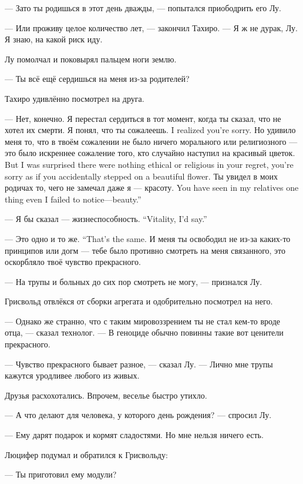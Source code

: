 --- Зато ты родишься в этот день дважды, --- попытался приободрить его Лу.

--- Или проживу целое количество лет, --- закончил Тахиро.
--- Я ж не дурак, Лу.
Я знаю, на какой риск иду.

Лу помолчал и поковырял пальцем ноги землю.

--- Ты всё ещё сердишься на меня из-за родителей?

Тахиро удивлённо посмотрел на друга.

--- Нет, конечно.
Я перестал сердиться в тот момент, когда ты сказал, что не хотел их смерти.
{Я понял, что ты сожалеешь.}
{I realized you're sorry.}
{Но удивило меня то, что в твоём сожалении не было ничего морального или религиозного --- это было искреннее сожаление того, кто случайно наступил на красивый цветок.}
{But I was surprised there were nothing ethical or religious in your regret, you're sorry as if you accidentally stepped on a beautiful flower.}
{Ты увидел в моих родичах то, чего не замечал даже я --- красоту.}
{You have seen in my relatives one thing even I failed to notice---beauty.''}

{--- Я бы сказал --- жизнеспособность.}
{``Vitality, I'd say.''}

{--- Это одно и то же.}
{``That's the same.}
И меня ты освободил не из-за каких-то принципов или догм --- тебе было противно смотреть на меня связанного, это оскорбляло твоё чувство прекрасного.

--- На трупы и больных до сих пор смотреть не могу, --- признался Лу.

Грисвольд отвлёкся от сборки агрегата и одобрительно посмотрел на него.

--- Однако же странно, что с таким мировоззрением ты не стал кем-то вроде отца, --- сказал технолог.
--- В геноциде обычно повинны такие вот ценители прекрасного.

--- Чувство прекрасного бывает разное, --- сказал Лу.
--- Лично мне трупы кажутся уродливее любого из живых.

Друзья расхохотались.
Впрочем, веселье быстро утихло.

--- А что делают для человека, у которого день рождения? --- спросил Лу.

--- Ему дарят подарок и кормят сладостями.
Но мне нельзя ничего есть.

Люцифер подумал и обратился к Грисвольду:

--- Ты приготовил ему модули?

